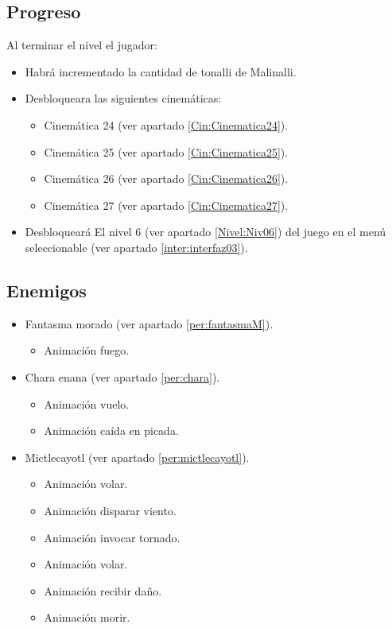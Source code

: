        \subsection{Progreso}
        Al terminar el nivel el jugador:
\begin{itemize}
        \item Habrá incrementado la cantidad de tonalli de Malinalli. 
        \item Desbloqueara las siguientes cinemáticas:
\begin{itemize}
        \item Cinemática 24 (ver apartado \ref{Cin:Cinematica24}). 
        \item Cinemática 25 (ver apartado \ref{Cin:Cinematica25}).
        \item Cinemática 26 (ver apartado \ref{Cin:Cinematica26}).
        \item Cinemática 27 (ver apartado \ref{Cin:Cinematica27}).
\end{itemize}
        \item Desbloqueará El nivel 6 (ver apartado  \ref{Nivel:Niv06}) del juego en el menú seleccionable (ver apartado \ref{inter:interfaz03}).
\end{itemize}

        \subsection{Enemigos}
\begin{itemize}
        \item Fantasma morado (ver apartado \ref{per:fantasmaM}).
        \begin{itemize}
				\item Animación fuego.
		\end{itemize}
        \item Chara enana  (ver apartado \ref{per:chara}).
        \begin{itemize}
				\item Animación vuelo.
				\item Animación caída en picada.
		\end{itemize}
		\item Mictlecayotl (ver apartado \ref{per:mictlecayotl}).
\begin{itemize}
        \item Animación volar.
        \item Animación disparar viento.
        \item Animación invocar tornado.
        \item Animación volar.
        \item Animación recibir daño.
		\item Animación morir.
\end{itemize}			
\end{itemize}
